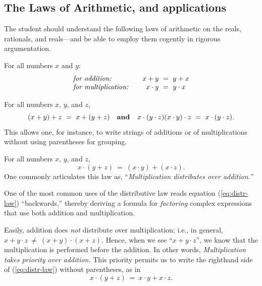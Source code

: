 \subsection{The Laws of Arithmetic, and applications}
\label{sec:Arithmetic-Laws}

The student should understand the following laws of arithmetic on the
reals, rationals, and reals---and be able to employ them cogently in
rigorous argumentation.

\medskip

%
For all numbers $x$ and $y$:
\[
\begin{array}{llc}
\mbox{\it for addition:}
  & & x+y \ = \ y+x \\
\mbox{\it for multiplication:}
  & & x \cdot y \ = \ y \cdot x
\end{array}
\]

\medskip

%
For all numbers $x$, $y$, and $z$,
\[ (x+y)+z \ = \ x+(y+z) \ \ \ \mbox{\bf and } \ \ 
x\cdot (y\cdot z) 
(x \cdot y) \cdot z \ = \ x\cdot (y\cdot z). \] 
This allows one, for instance, to write strings of additions or of
multiplications without using parentheses for grouping.

\medskip

%
For all numbers $x$, $y$, and $z$,
\begin{equation}
\label{eq:distr-law}
x \cdot (y + z) \ = \ (x \cdot y) + (x \cdot z).
\end{equation}
One commonly articulates this law as, ``{\em Multiplication
  distributes over addition.}''


One of the most common uses of the distributive law reads equation
(\ref{eq:distr-law}) ``backwards,'' thereby deriving a formula for
{\em factoring} \index{arithmetic!factoring} complex expressions that
use both addition and multiplication.

Easily, addition does {\em not} distribute over multiplication; i.e.,
in general, $x + y \cdot z \ \neq \ (x+y) \cdot (x+z)$.  Hence, when
we see ``$x + y \cdot z$'', we know that the multiplication is
performed before the addition.  In other words, {\em Multiplication
  takes priority over addition.}   This priority permits us to write the
righthand side of (\ref{eq:distr-law}) without parentheses, as in
\[ x \cdot (y + z) \ = \ x \cdot y + x \cdot z. \]

